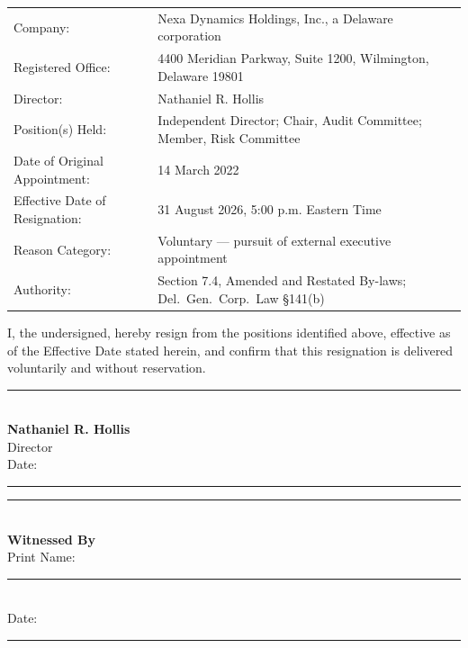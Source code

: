 \documentclass[english,11pt]{g-brief}
\begin{document}
\vspace{2mm}

\begin{tcolorbox}[
    enhanced,
    colback=white,
    colframe=BoardNavy,
    boxrule=1.2pt,
    arc=1mm,
    top=3mm,
    bottom=3mm,
    left=6mm,
    right=6mm,
    attach boxed title to top center={yshift=-3mm},
    boxed title style={colback=BoardNavy, arc=1mm, boxrule=0pt},
    title=\textcolor{white}{\bfseries INSTRUMENT OF RESIGNATION}
]
\vspace{3mm}
\small
\begin{tabularx}{\textwidth}{@{}l X@{}}
Company: & Nexa Dynamics Holdings, Inc., a Delaware corporation \\{}
Registered Office: & 4400 Meridian Parkway, Suite 1200, Wilmington, Delaware 19801 \\{}
Director: & Nathaniel R. Hollis \\{}
Position(s) Held: & Independent Director; Chair, Audit Committee; Member, Risk Committee \\{}
Date of Original Appointment: & 14 March 2022 \\{}
Effective Date of Resignation: & 31 August 2026, 5:00 p.m. Eastern Time \\{}
Reason Category: & Voluntary --- pursuit of external executive appointment \\{}
Authority: & Section 7.4, Amended and Restated By-laws; Del.\ Gen.\ Corp.\ Law \S141(b) \\
\end{tabularx}

\vspace{3mm}
\textcolor{DarkText}{I, the undersigned, hereby resign from the positions identified above, effective as of the Effective Date stated herein, and confirm that this resignation is delivered voluntarily and without reservation.}
\vspace{5mm}

\noindent
\begin{minipage}[t]{0.46\textwidth}
\textcolor{SlateGray}{\rule{\linewidth}{0.5pt}}\\[1mm]
\textbf{Nathaniel R. Hollis}\\
Director\\
Date: \rule{2.6cm}{0.4pt}
\end{minipage}\hfill
\begin{minipage}[t]{0.46\textwidth}
\textcolor{SlateGray}{\rule{\linewidth}{0.5pt}}\\[1mm]
\textbf{Witnessed By}\\
Print Name: \rule{2.6cm}{0.4pt}\\
Date: \rule{2.6cm}{0.4pt}
\end{minipage}
\par
\end{tcolorbox}
\end{document}
